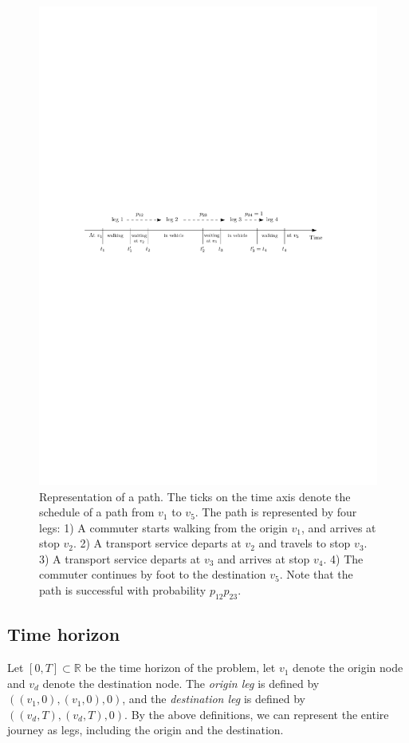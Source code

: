 \documentclass[dissertation,draft*]{aaltoseries}
\begin{document}
\begin{figure}[ht]
\begin{center}
\includegraphics[width=0.8\columnwidth]{journey02b}
\end{center}
\caption{Representation of a path. The ticks on the time axis denote the 
schedule of a path from $v_1$ to $v_5$. The path is represented by four legs: 
1) A commuter starts walking from the origin $v_1$, and arrives at stop $v_2$. 
2) A transport service departs at $v_2$ and travels to stop $v_3$. 
3) A transport service departs at $v_3$ and arrives at stop $v_4$. 
4) The commuter continues by foot to the destination $v_5$. Note that the path is successful
with probability $p_{12}p_{23}$.
}
\label{journey01}
\end{figure}


\subsection{Time horizon}
\label{problem}
Let $[0,T] \subset \mathbb{R}$ be the time horizon of the problem,
let $v_1$ denote the origin node and $v_d$ denote the destination node. 
The \emph{origin leg} is defined by $((v_1,0),(v_1,0),0)$, 
and the \emph{destination leg} 
is defined by $((v_{d},T),(v_{d},T),0)$.
By the above definitions, we can represent the entire journey 
as legs, including the origin and the destination. 
\end{document}
